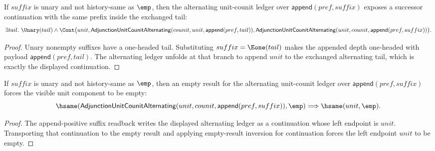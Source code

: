 \begin{theorem}
\label{thm:adjunction-unit-counit-alternating-append-positive-suffix-cont-readback}
If $suffix$ is unary and not history-same as $\emp$, then the alternating
unit-counit ledger over $\mathsf{append}(pref,suffix)$ exposes a successor
continuation with the same prefix inside the exchanged tail:
$$
\exists tail.\ \Unary(tail)\land
\Cont\bigl(unit,
\mathsf{AdjunctionUnitCounitAlternating}(counit,unit,\mathsf{append}(pref,tail)),
\mathsf{AdjunctionUnitCounitAlternating}(unit,counit,\mathsf{append}(pref,suffix))\bigr).
$$
\end{theorem}
\begin{proof}
Unary nonempty suffixes have a one-headed tail. Substituting
$suffix=\Eone(tail)$ makes the appended depth one-headed with payload
$\mathsf{append}(pref,tail)$. The alternating ledger unfolds at that branch to
append $unit$ to the exchanged alternating tail, which is exactly the
displayed continuation.
\end{proof}

\begin{theorem}
\label{thm:adjunction-alternating-append-positive-suffix-result-empty-unit-empty}
If \(suffix\) is unary and not history-same as \(\emp\), then an empty result
for the alternating unit-counit ledger over \(\mathsf{append}(pref,suffix)\)
forces the visible unit component to be empty:
$$
\hsame(\mathsf{AdjunctionUnitCounitAlternating}
  (unit,counit,\mathsf{append}(pref,suffix)),\emp)
\Longrightarrow \hsame(unit,\emp).
$$
\end{theorem}
\begin{proof}
The append-positive suffix readback writes the displayed alternating ledger as
a continuation whose left endpoint is \(unit\). Transporting that continuation
to the empty result and applying empty-result inversion for continuation
forces the left endpoint \(unit\) to be empty.
\end{proof}

